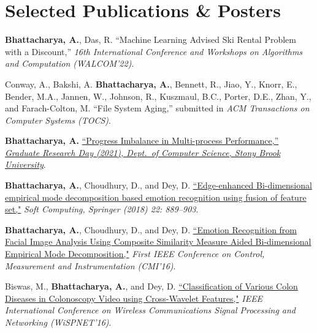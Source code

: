 \documentclass[letterpaper,10pt]{article}
\begin{document}
\section{Selected Publications \& Posters}
\resumeSubHeadingListStart
\item{\textbf{Bhattacharya, A.}, Das, R. {``Machine Learning Advised Ski Rental Problem with a Discount,''} \textit{16th International Conference and Workshops on Algorithms and Computation (WALCOM'22)}.}
\item {Conway, A., Bakshi, A. \textbf{Bhattacharya, A.}, Bennett, R., Jiao, Y., Knorr, E., Bender, M.A., Jannen, W., Johnson, R., Kuszmaul, B.C., Porter, D.E., Zhan, Y., and Farach-Colton, M. {``File System Aging,''} submitted in \textit{ACM Transactions on Computer Systems (TOCS)}.}
\item {\textbf{Bhattacharya, A.} \href{https://www3.cs.stonybrook.edu/~grd/posters/GRD_2021_Poster_Arghya_Bhattacharya.pdf}{``Progress Imbalance in Multi-process Performance,''} \href{https://www3.cs.stonybrook.edu/~grd/index.html}{\textit{Graduate Research Day (2021), Dept.\ of Computer Science, Stony Brook University}}.}
\item {\textbf{Bhattacharya, A.}, Choudhury, D., and Dey, D. \href{https://doi.org/10.1007/s00500-016-2395-4}{``Edge-enhanced Bi-dimensional empirical mode decomposition based emotion recognition using fusion of feature set,"} \textit{Soft Computing, Springer (2018) 22: 889--903}.}
\item {\textbf{Bhattacharya, A.}, Choudhury, D., and Dey, D. \href{https://doi.org/10.1109/CMI.2016.7413766}{``Emotion Recognition from Facial Image Analysis Using Composite Similarity Measure Aided Bi-dimensional Empirical Mode Decomposition,"} \textit{First IEEE Conference on Control, Measurement and Instrumentation (CMI’16)}.}
\item {Biswas, M., \textbf{Bhattacharya, A.}, and Dey, D. \href{https://doi.org/10.1109/WiSPNET.2016.7566521} {``Classification of Various Colon Diseases in Colonoscopy Video using Cross-Wavelet Features,"} \textit{IEEE International Conference on Wireless Communications Signal Processing and Networking (WiSPNET'16)}.}
\resumeSubHeadingListEnd
\end{document}
